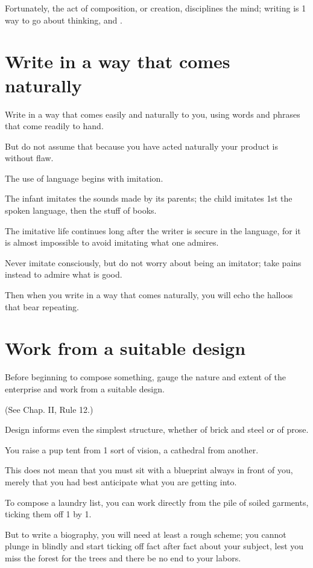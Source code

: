 \documentclass{book}
\numberwithin{equation}{section}
\begin{document}
Fortunately, the act of composition, or creation, disciplines the mind; writing is 1 way to go about thinking, and .

\section{Write in a way that comes naturally}
Write in a way that comes easily and naturally to you, using words and phrases that come readily to hand.

But do not assume that because you have acted naturally your product is without flaw.

%
The use of language begins with imitation.

The infant imitates the sounds made by its parents; the child imitates 1st the spoken language, then the stuff of books.

The imitative life continues long after the writer is secure in the language, for it is almost impossible to avoid imitating what one admires.

Never imitate consciously, but do not worry about being an imitator; take pains instead to admire what is good.

Then when you write in a way that comes naturally, you will echo the halloos that bear repeating.

\section{Work from a suitable design}
Before beginning to compose something, gauge the nature and extent of the enterprise and work from a suitable design.

(See Chap. II, Rule 12.)

Design informs even the simplest structure, whether of brick and steel or of prose.

You raise a pup tent from 1 sort of vision, a cathedral from another.

This does not mean that you must sit with a blueprint always in front of you, merely that you had best anticipate what you are getting into.

To compose a laundry list, you can work directly from the pile of soiled garments, ticking them off 1 by 1.

But to write a biography, you will need at least a rough scheme; you cannot plunge in blindly and start ticking off fact after fact about your subject, lest you miss the forest for the trees and there be no end to your labors.
\end{document}
